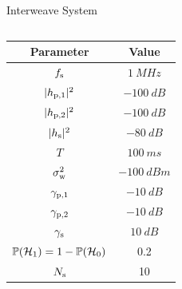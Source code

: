 \documentclass[16pt]{beamer}
\newcommand{\fs}[2]{\fontsize{#1 pt}{#2}\selectfont}
\begin{document}
\begin{frame}[t]{Interweave System}
	\vspace{-2mm}
	\begin{columns}
	\begin{column}{0.45\columnwidth}
	\fs{7}{8}
		\renewcommand{\arraystretch}{1.55}
		\begin{tabular}{c||c}
		\rowcolor{kit-green30}
		Parameter & Value \\
		\hline\hline
		$f_{\text{s}}$ & $\SI{1}{MHz}$ \\ %
		$|h_{\text{p,1}}|^2$ & $\SI{-100}{dB}$ \\ %
		$|h_{\text{p,2}}|^2$ & $\SI{-100}{dB}$ \\ %
		$|h_{\text{s}}|^2$ & $\SI{-80}{dB}$ \\ %
		$T$ & $\SI{100}{ms}$ \\ %
		$\sigma^2_{\text{w}}$ & $\SI{-100}{dBm}$ \\ %
		${\gamma}_{\text{p,1}}$ & $\SI{-10}{dB}$ \\ %
		${\gamma}_{\text{p,2}}$ & $\SI{-10}{dB}$ \\ %
		${\gamma}_{\text{s}}$ & $\SI{10}{dB}$ \\ %
		$\mathbb P(\mathcal{H}_1) = 1 - \mathbb P(\mathcal{H}_0)$ & 0.2 \\ %
		$N_{\text{s}}$ & 10 \\ \hline
	\end{tabular}


\end{column}
\end{columns}
\end{frame}
\end{document}
